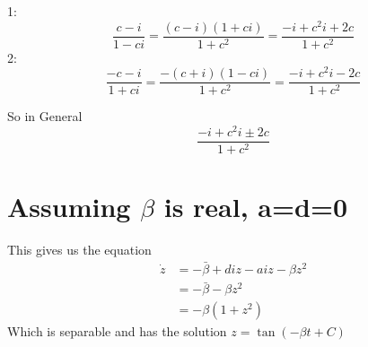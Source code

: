 \documentclass[10pt]{article}
\begin{document}
1:
$$\frac{c-i}{1-ci}=\frac{(c-i)(1+ci)}{1+c^2}=\frac{-i+c^2i+2c}{1+c^2}$$
2:
$$\frac{-c-i}{1+ci}=\frac{-(c+i)(1-ci)}{{1+c^2}}=\frac{-i+c^2i-2c}{{1+c^2}}$$

So in General
$$\frac{-i+c^2i\pm2c}{{1+c^2}}$$

\section{Assuming $\beta$ is real, a=d=0}
This gives us the equation
\begin{align*}
\dot z&=-\bar\beta+diz-aiz-\beta z^2\\
&=-\bar\beta-\beta z^2\\
&=-\beta(1+z^2)
\end{align*}
Which is separable and has the solution $z=\tan(-\beta t+C)$
\end{document}
